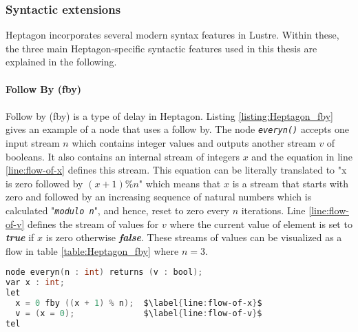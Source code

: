 \documentclass[10pt, a4paper]{article}
\newcommand{\textFunc}[1]{\texttt{\textit{#1}}}
\begin{document}
    \subsubsection{Syntactic extensions}
    \label{section:syntactic-extensions}
    Heptagon incorporates several modern syntax features in Lustre. Within these, the three main Heptagon-specific syntactic features used in this thesis are explained in the following.
    \\ \\
    \textbf{Follow By (fby)}
    \\ \\
    Follow by (fby) is a type of delay in Heptagon. Listing \ref{listing:Heptagon_fby} gives an example of a node that uses a follow by. The node \textFunc{everyn()} accepts one input stream $n$ which contains integer values and outputs another stream $v$ of booleans. It also contains an internal stream of integers $x$ and the equation in line \ref{line:flow-of-x} defines this stream. This equation can be literally translated to "x is zero followed by $(x+1)\%n$" which means that $x$ is a stream that starts with zero and followed by an increasing sequence of natural numbers which is calculated "\textFunc{modulo n}", and hence, reset to zero every $n$ iterations. Line \ref{line:flow-of-v} defines the stream of values for $v$ where the current value of element is set to \textbf{\textit{true}} if $x$ is zero otherwise \textbf{\textit{false}}. These streams of values can be visualized as a flow in table \ref{table:Heptagon_fby} where $n=3$.

    \begin{lstlisting}[caption={Sample Heptagon code with follow bys}, label={listing:Heptagon_fby}, language=C]
node everyn(n : int) returns (v : bool);
var x : int;
let
  x = 0 fby ((x + 1) % n);  $\label{line:flow-of-x}$
  v = (x = 0);              $\label{line:flow-of-v}$
tel     \end{lstlisting}
\end{document}
